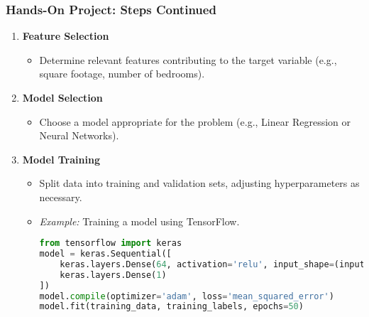 \documentclass[aspectratio=169]{beamer}
\begin{document}
\begin{frame}[fragile]
    \frametitle{Hands-On Project: Steps Continued}
    \begin{enumerate}[resume]
        \item \textbf{Feature Selection}
            \begin{itemize}
                \item Determine relevant features contributing to the target variable (e.g., square footage, number of bedrooms).
            \end{itemize}
        \item \textbf{Model Selection}
            \begin{itemize}
                \item Choose a model appropriate for the problem (e.g., Linear Regression or Neural Networks).
            \end{itemize}
        \item \textbf{Model Training}
            \begin{itemize}
                \item Split data into training and validation sets, adjusting hyperparameters as necessary.
                \item \textit{Example:} Training a model using TensorFlow.
                \begin{lstlisting}[language=Python]
from tensorflow import keras
model = keras.Sequential([
    keras.layers.Dense(64, activation='relu', input_shape=(input_shape,)),
    keras.layers.Dense(1)
])
model.compile(optimizer='adam', loss='mean_squared_error')
model.fit(training_data, training_labels, epochs=50)
                \end{lstlisting}
            \end{itemize}
    \end{enumerate}
\end{frame}
\end{document}
